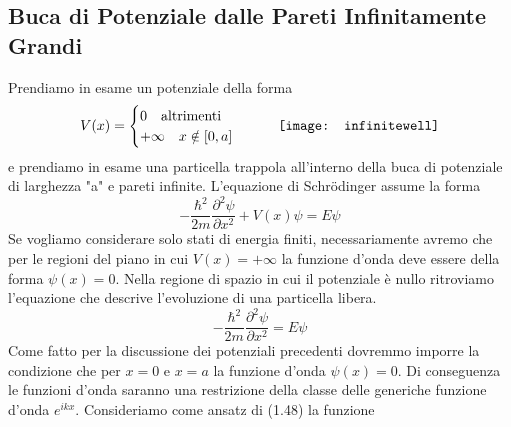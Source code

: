  \subsection{Buca di Potenziale dalle Pareti Infinitamente Grandi}
 
 Prendiamo in esame un potenziale della forma 
 \begin{equation*}
 	V(x) = \begin{cases}
 		0 \quad \text{altrimenti}\\
 		+ \infty \quad x \notin [0,a]
 	\end{cases} 
 	\quad \quad 
 	\vcenter{\hbox{\texttt{[image: infinitewell]}}}
 \end{equation*}
 e prendiamo in esame una particella trappola all'interno della buca di potenziale di larghezza "a" e pareti infinite. L'equazione di Schr\"odinger assume la forma 
 \begin{equation*}
 	-\frac{\hbar^2}{2m}\frac{\partial^2 \psi}{\partial x^2} + V(x)\psi = E \psi
 \end{equation*}
 Se vogliamo considerare solo stati di energia finiti, necessariamente avremo che per le regioni del piano in cui $V(x) = + \infty$ la funzione d'onda deve essere della forma $\psi(x) = 0$. Nella regione di spazio in cui il potenziale \`e nullo ritroviamo l'equazione che descrive l'evoluzione di una particella libera.
 \begin{equation}
 	-\frac{\hbar^2}{2m}\frac{\partial^2 \psi}{\partial x^2}  = E \psi
 \end{equation}
 Come fatto per la discussione dei potenziali precedenti dovremmo imporre la condizione che per $x = 0$ e $x = a$ la funzione d'onda $\psi(x) = 0$. Di conseguenza le funzioni d'onda saranno una restrizione della classe delle generiche funzione d'onda $e^{ikx}$. Consideriamo come ansatz di (1.48) la funzione 
 \newpage
 
